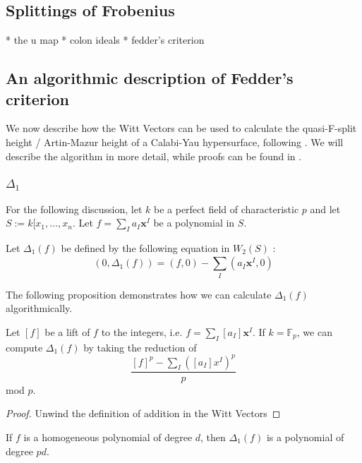 \subsection{Splittings of Frobenius}

* the u map
* colon ideals
* fedder's criterion

\subsection{An algorithmic description of Fedder's criterion}

We now describe how the Witt Vectors can be used to calculate the 
quasi-F-split height / Artin-Mazur height of a Calabi-Yau 
hypersurface, following \cite{quasifedder}.
We will describe the algorithm in more detail, while proofs can be
found in \cite{quasifedder}.

\subsubsection{\(\Delta_{1}\)}

For the following discussion, 
let \(k\) be a perfect field of characteristic \(p\) and 
let \(S := k[x_{1}, \ldots, x_{n}\).
Let \(f = \sum_{I}^{} a_{I}\mathbf{x}^{I}\) be a polynomial in \(S\).

\begin{defn}
	Let \(\Delta_{1}(f)\)
	be defined by the following equation in \(W_{2}(S)\) :
	\[
		(0, \Delta_{1}(f)) = (f,0) - \sum_{I}^{} (a_{I}\mathbf{x}^{I}, 0) 
	\] 
\end{defn}

The following proposition demonstrates how we can calculate 
\(\Delta_{1}(f)\) algorithmically.

\begin{prop}
	\label{prop:delta1:formula}
	Let \([f]\) be a lift of \(f\) to the integers,
	i.e.
	\(f = \sum_{I}^{} [a_{I}] \mathbf{x}^{I}\).
	If \(k = \mathbb{F}_{p}\),
	we can compute \(\Delta_{1}(f)\) by 
	taking the reduction of
	\[
		\frac{[f]^{p} - \sum_{I}^{} ([a_{I}]x^{I})^{p} }{p}
	\] 
	mod \(p\).
\end{prop}

\begin{proof}
	Unwind the definition of addition in the Witt Vectors
\end{proof}

\begin{rmk}
	If \(f\) is a homogeneous polynomial of degree \(d\), 
	then \(\Delta_{1}(f)\) is a polynomial of degree \(pd\).
\end{rmk}

